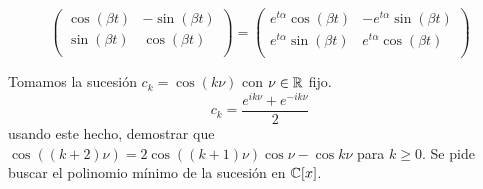 \begin{ejemplo}
\[\begin{pmatrix}
                             \cos(\beta t)& -\sin(\beta t)\\
                             \sin(\beta t)&\cos(\beta t) \\
                           \end{pmatrix}=
                           \begin{pmatrix}
                             e^{t\alpha}\cos(\beta t)& -e^{t\alpha}\sin(\beta t)\\
                             e^{t\alpha}\sin(\beta t)&e^{t\alpha}\cos(\beta t) \\
                           \end{pmatrix}
                         \]
\end{ejemplo}

\begin{ejercicio}
  Tomamos la sucesión \(c_k=\cos(k\nu)\) con \(\nu\in\mathbb{R}\) fijo.
  \[
    c_k=\frac{e^{ik\nu}+e^{-ik\nu}}{2}
  \]
  usando este hecho, demostrar que \(\cos((k+2)\nu)=
  2\cos((k+1)\nu)\cos\nu-\cos k\nu\) para \(k\ge0\). Se pide buscar
  el polinomio mínimo de la sucesión en \(\mathbb{C}[x]\).
\end{ejercicio}